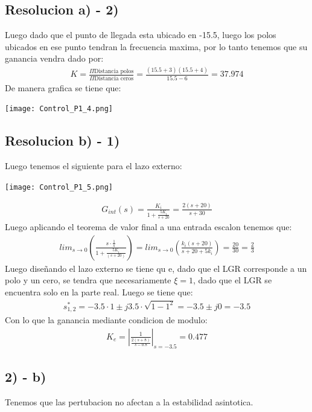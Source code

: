 \documentclass[
  11pt,
  letterpaper,
   addpoints,
   answers
  ]{exam}
\begin{document}
\begin{questions}
\begin{solution}
\subsection*{Resolucion a) - 2)}
Luego dado que el punto de llegada esta ubicado en -15.5, luego los polos ubicados en ese punto tendran la frecuencia maxima, por lo tanto tenemos que su ganancia vendra dado por:
\begin{align}
    K= \frac{\Pi \text{Distancia polos}}{\Pi \text{Distancia ceros}} = \frac{(15.5+3)(15.5+4)}{15.5-6} = 37.974
\end{align}
De manera grafica se tiene que:
\begin{center}
    \texttt{[image: Control\_P1\_4.png]}
\end{center}
\subsection*{Resolucion b) - 1)}
Luego tenemos el siguiente para el lazo externo:
\begin{center}
    \texttt{[image: Control\_P1\_5.png]}
\end{center}
\begin{align}
    G_{int}(s) = \frac{K_{i}}{1+\frac{5K_i}{s+20}}= \frac{2(s+20)}{s+30}
\end{align}
Luego aplicando el teorema de valor final a una entrada escalon tenemos que:
\begin{align}
    lim_{s \rightarrow 0}\left(\frac{s \cdot \frac{1}{s}}{1+ \frac{5K_i}{(s+20)}}\right) = lim_{s \rightarrow 0} \left(\frac{k_{i}(s+20)}{s+20+5k_i}\right) = \frac{20}{30} = \frac{2}{3}
\end{align}
Luego diseñando el lazo externo se tiene qu e, dado que el LGR corresponde a un polo y un cero, se tendra que necesariamente $\xi=1$, dado que el LGR se encuentra solo en la parte real. Luego se tiene que:
\begin{align}
    s_{1,2}^{*} = -3.5 \cdot 1 \pm j3.5 \cdot \sqrt{1-1^{2}} = -3.5 \pm j0 = -3.5
\end{align}
Con lo que la ganancia mediante condicion de modulo:
\begin{align}
    K_{e} = \left| \frac{1}{\frac{2(s+8)}{s-0.8}}\right|_{s=-3.5} = 0.477
\end{align}
\subsection*{2) - b)}
Tenemos que las pertubacion no afectan a la estabilidad asintotica.

\end{solution}
\end{questions}
\end{document}
